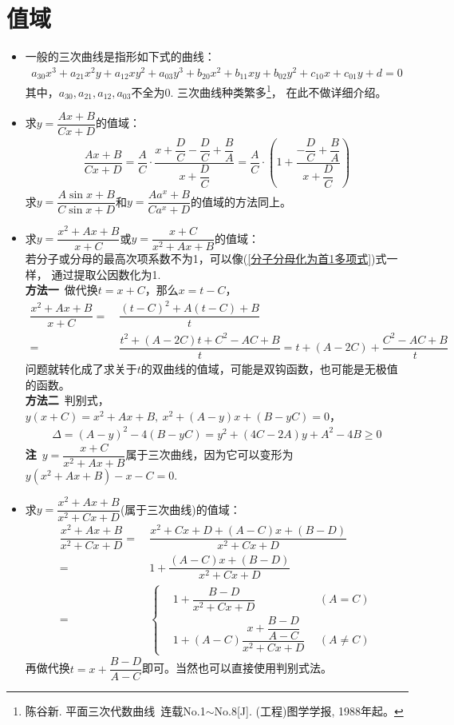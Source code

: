 \section{值域} 
\begin{itemize}[leftmargin=\inteval{\myitemleftmargin}pt,itemsep=
   \inteval{\myitemitempsep}pt,topsep=\inteval{\myitemtopsep}pt]
\item 一般的三次曲线是指形如下式的曲线：
\begin{gather*}
    a_{30}x^3+a_{21}x^2y+a_{12}xy^2+a_{03}y^3+b_{20}x^2+b_{11}xy+b_{02}y^2+
    c_{10}x+c_{01}y+d=0
\end{gather*}
其中，$ a_{30},a_{21},a_{12},a_{03} $不全为0. 三次曲线种类繁多\footnote{陈谷新. 
    平面三次代数曲线\ 连载No.1$ \sim $No.8[J]. (工程)图学学报, 1988年起。}，
在此不做详细介绍。

\item 求$ y=\dfrac{Ax+B}{Cx+D} $的值域：
\begin{align}\label{分子分母化为首1多项式}
    \dfrac{Ax+B}{Cx+D} =
    \dfrac{A}{C}\cdot\dfrac{x+\dfrac{D}{C}-\dfrac{D}{C}+\dfrac{B}{A}}
    {x+\dfrac{D}{C}}=\dfrac{A}{C}\cdot
    \left(1+\dfrac{-\dfrac{D}{C}+\dfrac{B}{A}}{x+\dfrac{D}{C}}\right)
\end{align}
求$ y=\dfrac{A\sin x+B}{C\sin x+D}$和$ y=\dfrac{Aa^x+B}{Ca^x+D}$的值域的方法同上。

\item 求$ y=\dfrac{x^2+Ax+B}{x+C} $或$ y=\dfrac{x+C}{x^2+Ax+B} $的值域：\\
若分子或分母的最高次项系数不为1，可以像(\ref{分子分母化为首1多项式})式一样，
通过提取公因数化为1. \\
\textbf{方法一}\ 做代换$ t=x+C $，那么$ x=t-C $，
\begin{align*}
    \dfrac{x^2+Ax+B}{x+C}=&\ \dfrac{(t-C)^2+A(t-C)+B}{t}\\
    =&\ \dfrac{t^2+(A-2C)t+C^2-AC+B}{t}=t+(A-2C)+\dfrac{C^2-AC+B}{t}
\end{align*}
问题就转化成了求关于$ t $的双曲线的值域，可能是双钩函数，也可能是无极值的函数。\\
\textbf{方法二}\ 判别式，$ y(x+C)=x^2+Ax+B,\ x^2+(A-y)x+(B-yC)=0 $，
\begin{align*}
    \Delta=(A-y)^2-4(B-yC)=y^2+(4C-2A)y+A^2-4B\geq 0 
\end{align*}
\textbf{注}\ $ y=\dfrac{x+C}{x^2+Ax+B} $属于三次曲线，因为它可以变形为$ y(x^2+Ax+B)-x-C=0 $. 

\item 求$ y=\dfrac{x^2+Ax+B}{x^2+Cx+D} $(属于三次曲线)的值域：
\begin{align*}
    \dfrac{x^2+Ax+B}{x^2+Cx+D} =&\  \dfrac{x^2+Cx+D+(A-C)x+(B-D)}{x^2+Cx+D} \\
    =&\ 1+\dfrac{(A-C)x+(B-D)}{x^2+Cx+D}  \\
    =&\ \left\{\begin{aligned}
        & 1+\dfrac{B-D}{x^2+Cx+D} & (A = C) \\
        & 1+(A-C)\dfrac{x+\dfrac{B-D}{A-C}}{x^2+Cx+D} \ \  & (A\neq C)
    \end{aligned} \right.
\end{align*}
再做代换$ t=x+\dfrac{B-D}{A-C} $即可。当然也可以直接使用判别式法。


\end{itemize}
